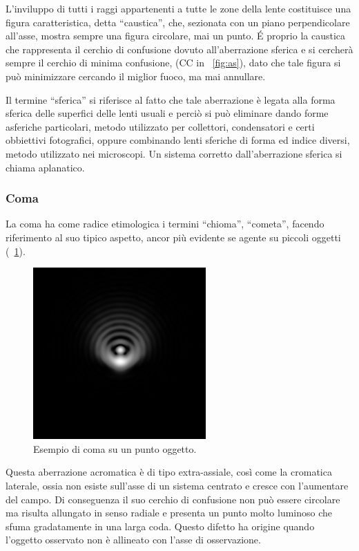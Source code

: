 L'inviluppo di tutti i raggi appartenenti a tutte le zone della lente costituisce una figura caratteristica, detta ``caustica'', che, sezionata con un piano perpendicolare all'asse, mostra sempre una figura circolare, mai un punto.
\'E proprio la caustica che rappresenta il cerchio di confusione dovuto all'aberrazione sferica e si cercherà sempre il cerchio di minima confusione, (CC in \figurename~\ref{fig:as}), dato che tale figura si può minimizzare cercando il miglior fuoco, ma mai annullare.

Il termine ``sferica'' si riferisce al fatto che tale aberrazione è legata alla forma sferica delle superfici delle lenti usuali e perciò si può eliminare dando forme asferiche particolari, metodo utilizzato per collettori, condensatori e certi obbiettivi fotografici, oppure combinando lenti sferiche di forma ed indice diversi, metodo utilizzato nei microscopi. 
Un sistema corretto dall'aberrazione sferica si chiama aplanatico.

\subsubsection*{Coma}
La coma ha come radice etimologica i termini ``chioma'', ``cometa'', facendo riferimento al suo tipico aspetto, ancor più evidente se agente su piccoli oggetti (\figurename~\ref{fig:coma}).

\begin{figure}
 \centering
 \includegraphics[scale=.55]{img/CAP2coma.jpg}
 \caption{\small{Esempio di coma su un punto oggetto.}}
 \label{fig:coma}
\end{figure}

Questa aberrazione acromatica è di tipo extra-assiale, così come la cromatica laterale, ossia non esiste sull'asse di un sistema centrato e cresce con l'aumentare del campo. 
Di conseguenza il suo cerchio di confusione non può essere circolare ma risulta allungato in senso radiale e presenta un punto molto luminoso che sfuma gradatamente in una larga coda.
Questo difetto ha origine quando l'oggetto osservato non è allineato con l'asse di osservazione.

